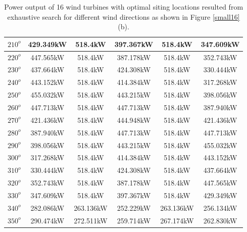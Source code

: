 \begin{table}[H]
\begin{tabular}{|c|c|c|c|c|c|}
		$210^o$	& 429.349kW	& 518.4kW	& 397.367kW	& 518.4kW	& 347.609kW	\\ \hline
		$220^o$	& 447.565kW	& 518.4kW	& 387.178kW	& 518.4kW	& 352.743kW	\\ \hline
		$230^o$	& 437.664kW	& 518.4kW	& 424.308kW	& 518.4kW	& 330.444kW	\\ \hline
		$240^o$	& 443.152kW	& 518.4kW	& 414.384kW	& 518.4kW	& 317.268kW	\\ \hline
		$250^o$	& 455.032kW	& 518.4kW	& 443.215kW	& 518.4kW	& 398.056kW	\\ \hline
		$260^o$	& 447.713kW	& 518.4kW	& 447.713kW	& 518.4kW	& 387.940kW	\\ \hline
		$270^o$	& 421.436kW	& 518.4kW	& 444.948kW	& 518.4kW	& 421.436kW	\\ \hline
		$280^o$	& 387.940kW	& 518.4kW	& 447.713kW	& 518.4kW	& 447.713kW	\\ \hline
		$290^o$	& 398.056kW	& 518.4kW	& 443.215kW	& 518.4kW	& 455.032kW	\\ \hline
		$300^o$	& 317.268kW	& 518.4kW	& 414.384kW	& 518.4kW	& 443.152kW	\\ \hline
		$310^o$	& 330.444kW	& 518.4kW	& 424.308kW	& 518.4kW	& 437.664kW	\\ \hline
		$320^o$	& 352.743kW	& 518.4kW	& 387.178kW	& 518.4kW	& 447.565kW	\\ \hline
		$330^o$	& 347.609kW	& 518.4kW	& 397.367kW	& 518.4kW	& 429.349kW	\\ \hline
		$340^o$	& 282.086kW	& 263.136kW	& 252.229kW	& 263.136kW	& 256.134kW	\\ \hline
		$350^o$	& 290.474kW	& 272.511kW	& 259.714kW	& 267.174kW	& 262.830kW	\\ \hline
        	\end{tabular}
        	\caption{Power output of 16 wind turbines with optimal siting locations resulted from exhaustive search for different wind directions as shown in Figure \ref{small16} (b).}
        	\label{table16b}
        \end{table}
